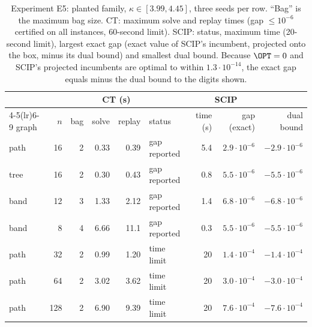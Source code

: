 \begin{table}[t]
\centering\small
\setlength{\tabcolsep}{4pt}
\caption{Experiment E5: planted family, $\kappa\in[3.99,4.45]$, three seeds per
row. ``Bag'' is the maximum bag size. CT: maximum solve and replay times
(gap $\le10^{-6}$ certified on all instances, 60-second limit). SCIP: status,
maximum time (20-second limit), largest exact gap (exact value of SCIP's
incumbent, projected onto the box, minus its dual bound) and smallest dual
bound. Because $\OPT=0$ and SCIP's projected incumbents are optimal to within
$1.3\cdot10^{-14}$, the exact gap equals minus the dual bound to the digits
shown.}\label{tab:scip}
\begin{tabular}{lrrrrlrrr}
\toprule
&&&\multicolumn{2}{c}{CT (s)}&\multicolumn{4}{c}{SCIP}\\
\cmidrule(lr){4-5}\cmidrule(lr){6-9}
graph & $n$ & bag & solve & replay & status & time (s) & gap (exact) & dual bound\\
\midrule
path & 16 & 2 & 0.33 & 0.39 & gap reported & 5.4 & $2.9\cdot10^{-6}$ & $-2.9\cdot10^{-6}$\\
tree & 16 & 2 & 0.30 & 0.43 & gap reported & 0.8 & $5.5\cdot10^{-6}$ & $-5.5\cdot10^{-6}$\\
band & 12 & 3 & 1.33 & 2.12 & gap reported & 1.4 & $6.8\cdot10^{-6}$ & $-6.8\cdot10^{-6}$\\
band & 8 & 4 & 6.66 & 11.1 & gap reported & 0.3 & $5.5\cdot10^{-6}$ & $-5.5\cdot10^{-6}$\\
path & 32 & 2 & 0.99 & 1.20 & time limit & 20 & $1.4\cdot10^{-4}$ & $-1.4\cdot10^{-4}$\\
path & 64 & 2 & 3.02 & 3.62 & time limit & 20 & $3.0\cdot10^{-4}$ & $-3.0\cdot10^{-4}$\\
path & 128 & 2 & 6.90 & 9.39 & time limit & 20 & $7.6\cdot10^{-4}$ & $-7.6\cdot10^{-4}$\\
\bottomrule
\end{tabular}
\end{table}

